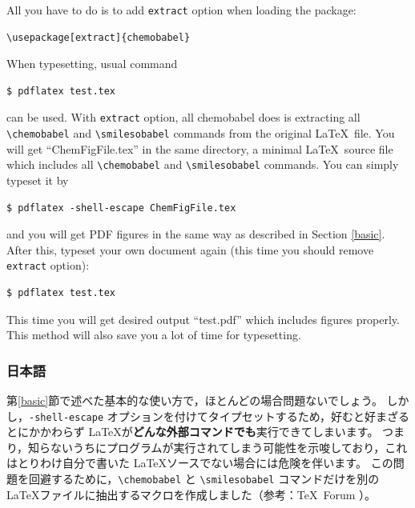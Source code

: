 \documentclass[12pt]{jsarticle}
\begin{document}
All you have to do is to add \verb|extract| option when loading the package:
\begin{verbatim}
\usepackage[extract]{chemobabel}
\end{verbatim}
When typesetting, usual command
\begin{verbatim}
$ pdflatex test.tex
\end{verbatim}
can be used. 
With \verb|extract| option, all \textsf{chemobabel} does is extracting all \verb|\chemobabel| and \verb|\smilesobabel| commands from the original \LaTeX\ file.
You will get ``ChemFigFile.tex'' in the same directory, a minimal \LaTeX\ source file which includes all \verb|\chemobabel| and \verb|\smilesobabel| commands.
You can simply typeset it by
\begin{verbatim}
$ pdflatex -shell-escape ChemFigFile.tex
\end{verbatim}
and you will get PDF figures in the same way as described in Section \ref{basic}.
After this, typeset your own document again (this time you should remove \verb|extract| option):
\begin{verbatim}
$ pdflatex test.tex
\end{verbatim}
This time you will get desired output ``test.pdf'' which includes figures properly.
This method will also save you a lot of time for typesetting.

\clearpage

\subsubsection{日本語}

第\ref{basic}節で述べた基本的な使い方で，ほとんどの場合問題ないでしょう。
しかし，\verb|-shell-escape| オプションを付けてタイプセットするため，好むと好まざるとにかかわらず \LaTeX が\textbf{どんな外部コマンドでも}実行できてしまいます。
つまり，知らないうちにプログラムが実行されてしまう可能性を示唆しており，これはとりわけ自分で書いた \LaTeX ソースでない場合には危険を伴います。
この問題を回避するために，\verb|\chemobabel| と \verb|\smilesobabel| コマンドだけを別の \LaTeX ファイルに抽出するマクロを作成しました（参考：\TeX\ Forum \cite{OKU}）。
\end{document}
